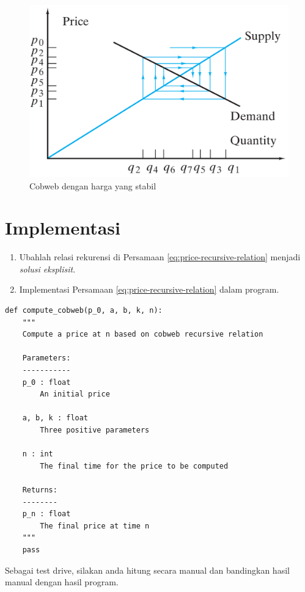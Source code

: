 \documentclass{article}
\theoremstyle{plain}
\begin{document}
\begin{figure}[!ht]
	\centering
	\includegraphics[scale=.225]{images/cobweb-ilustrasi}
	\caption{Cobweb dengan harga yang stabil \citep{johnsonbaugh2009discrete}}
	\label{eq:cobweb-ilustrasi}
\end{figure}

\section*{Implementasi}
	\begin{enumerate}[-,topsep=0pt, nosep,label=\arabic*. ]
		\item Ubahlah relasi rekurensi di Persamaan \eqref{eq:price-recursive-relation} menjadi \textit{solusi eksplisit}.  
		\item Implementasi Persamaan \eqref{eq:price-recursive-relation} dalam program.
	\end{enumerate}

\begin{verbatim}
def compute_cobweb(p_0, a, b, k, n):
    """
    Compute a price at n based on cobweb recursive relation	
    
    Parameters:
    -----------
    p_0 : float
        An initial price
    
    a, b, k : float
        Three positive parameters
    
    n : int
        The final time for the price to be computed    
    
    Returns:
    --------
    p_n : float
        The final price at time n
    """
    pass
\end{verbatim}

\noindent Sebagai test drive, silakan anda hitung secara manual dan bandingkan hasil manual dengan hasil program.




\end{document}
